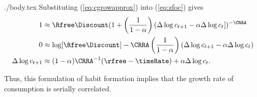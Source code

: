 \documentclass{handout}
\begin{document}
\begin{verbatimwrite}{./body.tex}
Substituting (\ref{eq:cgrowapprox}) into (\ref{eq:zfoc}) gives
\begin{equation*}\begin{gathered}\begin{aligned}
        1 & \approx  \Rfree\Discount (1+\left(\frac{1}{1-\alpha}\right)\left(\Delta \log c_{t+1} - \alpha \Delta \log c_{t} \right])^{-\CRRA} 
\\      0  & \approx  \log [\Rfree\Discount] - \CRRA \left(\frac{1}{1-\alpha}\right)\left(\Delta \log c_{t+1} - \alpha \Delta \log c_{t} \right)
\\ \Delta \log c_{t+1} & \approx  (1-\alpha)\CRRA^{-1}(\rfree - \timeRate) + \alpha \Delta \log c_{t}   
.
\end{aligned}\end{gathered}\end{equation*}

Thus, this formulation of habit formation implies that the growth rate of consumption
is serially correlated.
\end{verbatimwrite}




\end{document}
